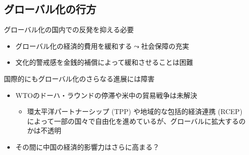 \documentclass[
  xelatex,
  ja=standard]{bxjsarticle}
\providecommand{\tightlist}{%
  \setlength{\itemsep}{0pt}\setlength{\parskip}{0pt}}\usepackage{longtable,booktabs,array}
\begin{document}
\hypertarget{ux30b0ux30edux30fcux30d0ux30ebux5316ux306eux884cux65b9}{%
\subsection{グローバル化の行方}\label{ux30b0ux30edux30fcux30d0ux30ebux5316ux306eux884cux65b9}}

グローバル化の国内での反発を抑える必要

\begin{itemize}
\tightlist
\item
  グローバル化の経済的費用を緩和する\(\leadsto\)社会保障の充実
\item
  文化的警戒感を金銭的補償によって緩和させることは困難
\end{itemize}

国際的にもグローバル化のさらなる進展には障害

\begin{itemize}
\tightlist
\item
  WTOのドーハ・ラウンドの停滞や米中の貿易戦争は未解決

  \begin{itemize}
  \tightlist
  \item
    環太平洋パートナーシップ (TPP) や地域的な包括的経済連携 (RCEP)
    によって一部の国々で自由化を進めているが、グローバルに拡大するのかは不透明
  \end{itemize}
\item
  その間に中国の経済的影響力はさらに高まる？
\end{itemize}


  
\end{document}
